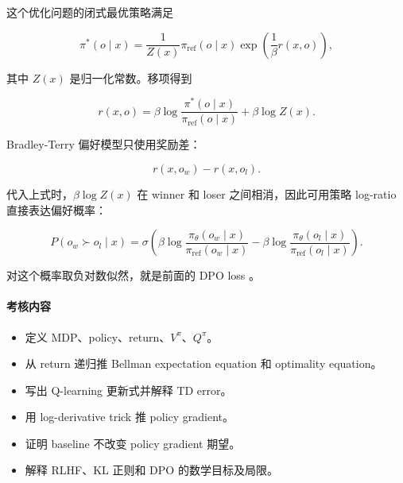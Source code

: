 这个优化问题的闭式最优策略满足

\[
  \pi^*(o\mid x)
  =
  \frac{1}{Z(x)}
  \pi_{\mathrm{ref}}(o\mid x)
  \exp\left(\frac{1}{\beta}r(x,o)\right),
\]

其中 \(Z(x)\) 是归一化常数。移项得到

\[
  r(x,o)
  =
  \beta
  \log
  \frac{\pi^*(o\mid x)}{\pi_{\mathrm{ref}}(o\mid x)}
  +
  \beta\log Z(x).
\]

Bradley-Terry 偏好模型只使用奖励差：

\[
  r(x,o_w)-r(x,o_l).
\]

代入上式时，\(\beta\log Z(x)\) 在 winner 和 loser 之间相消，因此可用策略 log-ratio 直接表达偏好概率：

\[
  P(o_w\succ o_l\mid x)
  =
  \sigma
  \left(
    \beta
    \log
    \frac{\pi_\theta(o_w\mid x)}{\pi_{\mathrm{ref}}(o_w\mid x)}
    -
    \beta
    \log
    \frac{\pi_\theta(o_l\mid x)}{\pi_{\mathrm{ref}}(o_l\mid x)}
  \right).
\]

对这个概率取负对数似然，就是前面的 DPO loss \parencite{rafailov2023dpo,jurafsky2026slp}。

\paragraph{考核内容}

\begin{itemize}
  \item 定义 MDP、policy、return、\(V^\pi\)、\(Q^\pi\)。
  \item 从 return 递归推 Bellman expectation equation 和 optimality equation。
  \item 写出 Q-learning 更新式并解释 TD error。
  \item 用 log-derivative trick 推 policy gradient。
  \item 证明 baseline 不改变 policy gradient 期望。
  \item 解释 RLHF、KL 正则和 DPO 的数学目标及局限。
\end{itemize}
